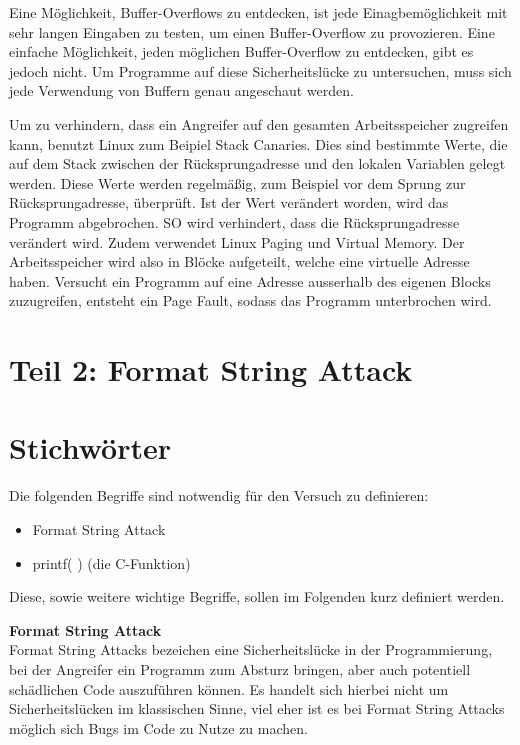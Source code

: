\documentclass[12pt,a4paper]{article}
\begin{document}
	Eine Möglichkeit, Buffer-Overflows zu entdecken, ist jede Einagbemöglichkeit mit sehr 
	langen Eingaben zu testen, um einen Buffer-Overflow zu provozieren.
	Eine einfache Möglichkeit, jeden möglichen Buffer-Overflow zu entdecken, gibt es jedoch nicht. 
	Um Programme auf diese Sicherheitslücke zu untersuchen, muss sich jede Verwendung von Buffern 
	genau angeschaut werden. 
	\bigskip
	
	Um zu verhindern, dass ein Angreifer auf den gesamten Arbeitsspeicher zugreifen kann, benutzt 
	Linux zum Beipiel Stack Canaries. Dies sind bestimmte Werte, die auf dem Stack zwischen 
	der Rücksprungadresse und den lokalen Variablen gelegt werden. Diese Werte werden regelmäßig, 
	zum Beispiel vor dem Sprung zur Rücksprungadresse, überprüft. Ist der Wert verändert worden, 
	wird das Programm abgebrochen. SO wird verhindert, dass die Rücksprungadresse verändert wird. 
	Zudem verwendet Linux Paging und Virtual Memory. Der Arbeitsspeicher wird also in Blöcke 
	aufgeteilt, welche eine virtuelle Adresse haben. Versucht ein Programm auf eine Adresse 
	ausserhalb des eigenen Blocks zuzugreifen, entsteht ein Page Fault, sodass das Programm 
	unterbrochen wird. 
	\bigskip

\section*{Teil 2: Format String Attack}
	
	
	\section*{Stichwörter}
	Die folgenden Begriffe sind notwendig für den Versuch zu definieren:
	\begin{itemize}
		\item Format String Attack
		\item printf( ) (die C-Funktion)
	\end{itemize}
	
	Diese, sowie weitere wichtige Begriffe, sollen im Folgenden kurz definiert werden.
	\bigskip
	
	\textbf{Format String Attack} \\
	Format String Attacks bezeichen eine Sicherheitslücke in der Programmierung, bei der Angreifer ein Programm zum Absturz bringen, aber auch potentiell schädlichen Code auszuführen können.
	Es handelt sich hierbei nicht um Sicherheitslücken im klassischen Sinne, viel eher ist es bei Format String Attacks möglich sich Bugs im Code zu Nutze zu machen.
	\bigskip
	
\end{document}
